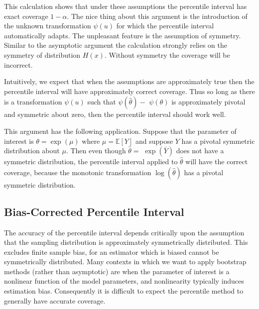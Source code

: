 \documentclass[10pt]{article}
\begin{document}
This calculation shows that under these assumptions the percentile interval has exact coverage $1-\alpha$. The nice thing about this argument is the introduction of the unknown transformation $\psi(u)$ for which the percentile interval automatically adapts. The unpleasant feature is the assumption of symmetry. Similar to the asymptotic argument the calculation strongly relies on the symmetry of distribution $H(x)$. Without symmetry the coverage will be incorrect.

Intuitively, we expect that when the assumptions are approximately true then the percentile interval will have approximately correct coverage. Thus so long as there is a transformation $\psi(u)$ such that $\psi(\widehat{\theta})-$ $\psi(\theta)$ is approximately pivotal and symmetric about zero, then the percentile interval should work well.

This argument has the following application. Suppose that the parameter of interest is $\theta=\exp (\mu)$ where $\mu=\mathbb{E}[Y]$ and suppose $Y$ has a pivotal symmetric distribution about $\mu$. Then even though $\widehat{\theta}=$ $\exp (\bar{Y})$ does not have a symmetric distribution, the percentile interval applied to $\widehat{\theta}$ will have the correct coverage, because the monotonic transformation $\log (\widehat{\theta})$ has a pivotal symmetric distribution.

\subsection{Bias-Corrected Percentile Interval}
The accuracy of the percentile interval depends critically upon the assumption that the sampling distribution is approximately symmetrically distributed. This excludes finite sample bias, for an estimator which is biased cannot be symmetrically distributed. Many contexts in which we want to apply bootstrap methods (rather than asymptotic) are when the parameter of interest is a nonlinear function of the model parameters, and nonlinearity typically induces estimation bias. Consequently it is difficult to expect the percentile method to generally have accurate coverage.
\end{document}
